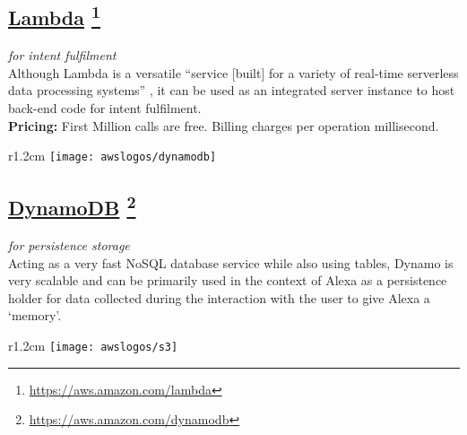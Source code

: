 	

\subsection*{
	\href{https://aws.amazon.com/lambda/}{\textbf{Lambda}} \footnote{\url{https://aws.amazon.com/lambda}}
}
	\textit{for intent fulfilment}\\
	Although Lambda is a versatile ``service [built] for a variety of real-time serverless data processing systems'' \cite{aws_website}, it can be used as an integrated server instance to host back-end code for intent fulfilment.\\	 %
	\textbf{Pricing:} First Million calls are free. Billing charges per operation millisecond.

	



\begin{wrapfigure}[2]{r}{1.2cm}
	\texttt{[image: awslogos/dynamodb]}
\end{wrapfigure}

%


\subsection*{
\href{https://aws.amazon.com/dynamodb/}{\textbf{DynamoDB}} \footnote{\url{https://aws.amazon.com/dynamodb}}
}
\textit{for persistence storage}\\
Acting as a very fast NoSQL database service while also using tables,
Dynamo is very scalable and can be primarily used in the context of Alexa as a persistence holder for data collected during the interaction with the user to give Alexa a `memory'.



\begin{wrapfigure}[2]{r}{1.2cm}
	\texttt{[image: awslogos/s3]}
\end{wrapfigure}

